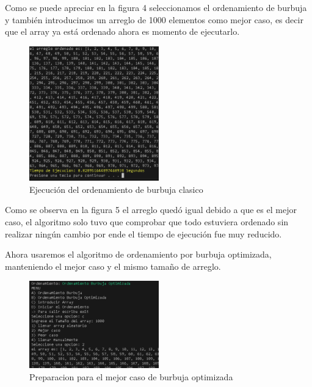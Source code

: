 \documentclass[journal]{IEEEtran}
\begin{document}
  Como se puede apreciar en la figura 4 seleccionamos 
  el ordenamiento de burbuja y también introducimos un 
  arreglo de 1000 elementos como mejor caso, es decir 
  que el array ya está ordenado ahora es momento de ejecutarlo.

  \begin{figure}[H]
    \centering
    \begin{adjustbox}{clip=false}
      \includegraphics[width=0.5\textwidth]{5.PNG}
    \end{adjustbox}
    \caption{Ejecución del ordenamiento de burbuja clasico}
  \end{figure}

  Como se observa en la figura 5 el arreglo quedó igual debido 
  a que es el mejor caso, el algoritmo solo tuvo que comprobar 
  que todo estuviera ordenado sin realizar ningún cambio por 
  ende el tiempo de ejecución fue muy reducido.

  Ahora usaremos el algoritmo de ordenamiento por 
  burbuja optimizada, manteniendo el mejor caso y 
  el mismo tamaño de arreglo.
  \begin{figure}[H]
    \centering
    \begin{adjustbox}{clip=false}
      \includegraphics[width=0.5\textwidth]{6.PNG}
    \end{adjustbox}
    \caption{Preparacion para el mejor caso de burbuja optimizada}
  \end{figure}
\end{document}
